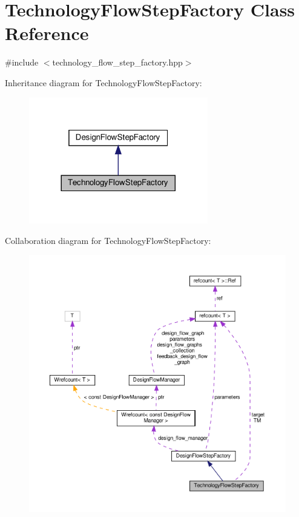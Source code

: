 \hypertarget{classTechnologyFlowStepFactory}{}\section{Technology\+Flow\+Step\+Factory Class Reference}
\label{classTechnologyFlowStepFactory}


{\ttfamily \#include $<$technology\+\_\+flow\+\_\+step\+\_\+factory.\+hpp$>$}



Inheritance diagram for Technology\+Flow\+Step\+Factory\+:
\nopagebreak
\begin{figure}[H]
\begin{center}
\leavevmode
\includegraphics[width=221pt]{d4/d78/classTechnologyFlowStepFactory__inherit__graph}
\end{center}
\end{figure}


Collaboration diagram for Technology\+Flow\+Step\+Factory\+:
\nopagebreak
\begin{figure}[H]
\begin{center}
\leavevmode
\includegraphics[width=350pt]{d6/dba/classTechnologyFlowStepFactory__coll__graph}
\end{center}
\end{figure}
